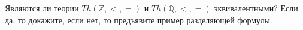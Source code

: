 Являются ли теории $Th(\mathbb{Z}, <, =)$ и $Th(\mathbb{Q}, <, =)$ эквивалентными? Если да, то докажите, если нет, то предъявите
пример разделяющей формулы.
